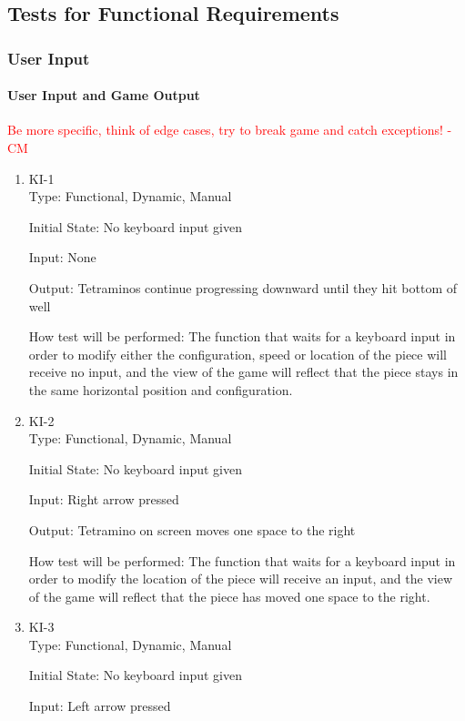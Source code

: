 \documentclass[12pt, titlepage]{article}
\begin{document}
\subsection{Tests for Functional Requirements}
\subsubsection{User Input}
\paragraph{User Input and Game Output}
\textcolor{red}{Be more specific, think of edge cases, try to break game and catch exceptions! - CM} \\
\begin{enumerate}
\item{KI-1\\}
Type: Functional, Dynamic, Manual
					
Initial State: No keyboard input given
					
Input: None
					
Output: Tetraminos continue progressing downward until they hit bottom of well
					
How test will be performed: The function that waits for a keyboard input in order to modify either the configuration, speed or location of the piece will receive no input, and the view of the game will reflect that the piece stays in the same horizontal position and configuration.
					
\item{KI-2\\}
Type: Functional, Dynamic, Manual
					
Initial State: No keyboard input given
					
Input: Right arrow pressed
					
Output: Tetramino on screen moves one space to the right
					
How test will be performed: The function that waits for a keyboard input in order to modify the location of the piece will receive an input, and the view of the game will reflect that the piece has moved one space to the right.

\item{KI-3\\}
Type: Functional, Dynamic, Manual
					
Initial State: No keyboard input given
					
Input: Left arrow pressed
					

\end{enumerate}
\end{document}
